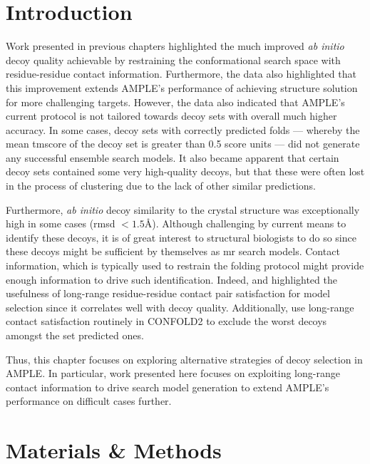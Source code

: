 \section{Introduction}
Work presented in previous chapters highlighted the much improved \textit{ab initio} decoy quality achievable by restraining the conformational search space with residue-residue contact information. Furthermore, the data also highlighted that this improvement extends AMPLE's performance of achieving structure solution for more challenging targets. However, the data also indicated that AMPLE's current protocol is not tailored towards decoy sets with overall much higher accuracy. In some cases, decoy sets with correctly predicted folds --- whereby the mean \gls{tmscore} of the decoy set is greater than 0.5 score units --- did not generate any successful ensemble search models. It also became apparent that certain decoy sets contained some very high-quality decoys, but that these were often lost in the process of clustering due to the lack of other similar predictions.

Furthermore, \textit{ab initio} decoy similarity to the crystal structure was exceptionally high in some cases (\gls{rmsd} $<1.5$\AA). Although challenging by current means to identify these decoys, it is of great interest to structural biologists to do so since these decoys might be sufficient by themselves as \gls{mr} search models. Contact information, which is typically used to restrain the folding protocol might provide enough information to drive such identification. Indeed, \textcite{Kosciolek2014-bt} and \textcite{De_Oliveira2017-gj} highlighted the usefulness of long-range residue-residue contact pair satisfaction for model selection since it correlates well with decoy quality. Additionally, \textcite{Adhikari2018-lj} use long-range contact satisfaction routinely in CONFOLD2 to exclude the worst decoys amongst the set predicted ones.

Thus, this chapter focuses on exploring alternative strategies of decoy selection in AMPLE. In particular, work presented here focuses on exploiting long-range contact information to drive search model generation to extend AMPLE's performance on difficult cases further.

\section{Materials \& Methods}
